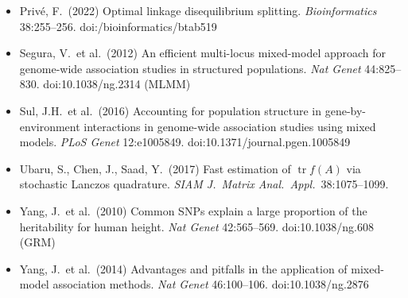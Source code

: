 \documentclass[11pt]{article}
\newcommand{\tr}{\operatorname{tr}}
\begin{document}
\begin{itemize}[nosep,leftmargin=1.4em]
  \emph{Nat Genet} 38:904--909. doi:10.1038/ng1847
\item Priv\'e, F.\ (2022) Optimal linkage disequilibrium splitting.
  \emph{Bioinformatics} 38:255--256. doi:/\allowbreak bioinformatics/\allowbreak btab519
\item Segura, V.\ et al.\ (2012) An efficient multi-locus mixed-model
  approach for genome-wide association studies in structured
  populations. \emph{Nat Genet} 44:825--830. doi:10.1038/ng.2314 (MLMM)
\item Sul, J.H.\ et al.\ (2016) Accounting for population structure in
  gene-by-environment interactions in genome-wide association studies
  using mixed models. \emph{PLoS Genet} 12:e1005849.
  doi:10.1371/\allowbreak journal.pgen.1005849
\item Ubaru, S., Chen, J., Saad, Y.\ (2017) Fast estimation of
  $\tr f(A)$ via stochastic Lanczos quadrature. \emph{SIAM J.\ Matrix
  Anal.\ Appl.}\ 38:1075--1099.
\item Yang, J.\ et al.\ (2010) Common SNPs explain a large proportion
  of the heritability for human height. \emph{Nat Genet} 42:565--569.
  doi:10.1038/ng.608 (GRM)
\item Yang, J.\ et al.\ (2014) Advantages and pitfalls in the
  application of mixed-model association methods. \emph{Nat Genet}
  46:100--106. doi:10.1038/ng.2876
\end{itemize}
\end{document}
